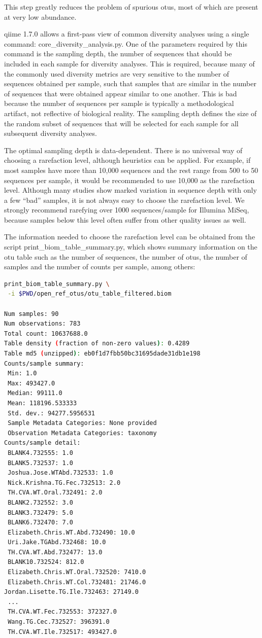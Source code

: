 This step greatly reduces the problem of spurious \gls{otu}s, most of which are
present at very low abundance.

\gls{qiime} 1.7.0 allows a first-pass view of common diversity analyses using a single
command: core\_diversity\_analysis.py. One of the parameters required by this command
is the sampling depth, the number of sequences that should be included in each sample
for diversity analyses. This is required, because many of the commonly used diversity
metrics are very sensitive to the number of sequences obtained per sample, such that
samples that are similar in the number of sequences that were obtained appear similar
to one another. This is bad because the number of sequences per sample is typically
a methodological artifact, not reflective of biological reality. The sampling depth
defines the size of the random subset of sequences that will be selected for each
sample for all subsequent diversity analyses.

The optimal sampling depth is data-dependent. There is no universal way of choosing a
rarefaction level, although heuristics can be applied. For example, if most samples have
more than 10,000 sequences and the rest range from 500 to 50 sequences per sample,
it would be recommended to use 10,000 as the rarefaction level. Although many studies
show marked variation in sequence depth with only a few “bad” samples, it is not always
easy to choose the rarefaction level. We strongly recommend rarefying over 1000
sequences/sample for Illumina MiSeq, because samples below this level often suffer
from other quality issues as well.

The information needed to choose the rarefaction level can be obtained from the
script print\_biom\_table\_summary.py, which shows summary information on the
\gls{otu} table such as the number of sequences, the number of \gls{otu}s, the
number of samples and the number of counts per sample, among others:

\begin{lstlisting}[language=bash]
print_biom_table_summary.py \
 -i $PWD/open_ref_otus/otu_table_filtered.biom

Num samples: 90
Num observations: 783
Total count: 10637688.0
Table density (fraction of non-zero values): 0.4289
Table md5 (unzipped): eb0f1d7fbb50bc31695dade31db1e198
Counts/sample summary:
 Min: 1.0
 Max: 493427.0
 Median: 99111.0
 Mean: 118196.533333
 Std. dev.: 94277.5956531
 Sample Metadata Categories: None provided
 Observation Metadata Categories: taxonomy
Counts/sample detail:
 BLANK4.732555: 1.0
 BLANK5.732537: 1.0
 Joshua.Jose.WTAbd.732533: 1.0
 Nick.Krishna.TG.Fec.732513: 2.0
 TH.CVA.WT.Oral.732491: 2.0
 BLANK2.732552: 3.0
 BLANK3.732479: 5.0
 BLANK6.732470: 7.0
 Elizabeth.Chris.WT.Abd.732490: 10.0
 Uri.Jake.TGAbd.732468: 10.0
 TH.CVA.WT.Abd.732477: 13.0
 BLANK10.732524: 812.0
 Elizabeth.Chris.WT.Oral.732520: 7410.0
 Elizabeth.Chris.WT.Col.732481: 21746.0
Jordan.Lisette.TG.Ile.732463: 27149.0
 ...
 TH.CVA.WT.Fec.732553: 372327.0
 Wang.TG.Cec.732527: 396391.0
 TH.CVA.WT.Ile.732517: 493427.0
\end{lstlisting}

